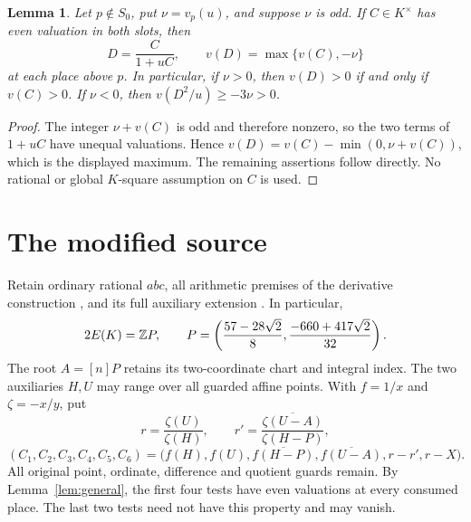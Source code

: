 \documentclass[11pt,a4paper]{article}
\newtheorem{lemma}[theorem]{Lemma}
\begin{document}
\begin{lemma}\label{lem:balanced}
Let $p\notin S_0$, put $\nu=v_p(u)$, and suppose $\nu$ is odd.
If $C\in K^\times$ has even valuation in both slots, then
\[
                 D=\frac{C}{1+uC},\qquad
                  v(D)=\max\{v(C),-\nu\}
\]
at each place above $p$. In particular, if $\nu>0$, then
$v(D)>0$ if and only if $v(C)>0$. If $\nu<0$, then
$v(D^2/u)\ge-3\nu>0$.
\end{lemma}
\begin{proof}
The integer $\nu+v(C)$ is odd and therefore nonzero, so the two
terms of $1+uC$ have unequal valuations. Hence
$v(D)=v(C)-\min(0,\nu+v(C))$, which is the displayed maximum.
The remaining assertions follow directly. No rational or global
$K$-square assumption on $C$ is used.
\end{proof}

\section{The modified source}
Retain ordinary rational $abc$, all arithmetic premises of the derivative
construction \cite{Derivative}, and its full auxiliary extension
\cite{FullAux}. In particular,
\[
 2E(K)=\mathbb Z P,\qquad
 P=\left(\frac{57-28\sqrt2}{8},\frac{-660+417\sqrt2}{32}\right).
\]
The root $A=[n]P$ retains its two-coordinate chart and integral index.
The two auxiliaries $H,U$ may range over all guarded affine points.
With $f=1/x$ and $\zeta=-x/y$, put
\[
 r=\frac{\zeta(U)}{\zeta(H)},\qquad
 r'=\overline{\frac{\zeta(U-A)}{\zeta(H-P)}},
\]
\[
 (C_1,C_2,C_3,C_4,C_5,C_6)
 =\bigl(f(H),f(U),\overline{f(H-P)},\overline{f(U-A)},r-r',r-X\bigr).
\]
All original point, ordinate, difference and quotient guards remain.
By Lemma~\ref{lem:general}, the first four tests have even valuations
at every consumed place. The last two tests need not have this property
and may vanish.
\end{document}
